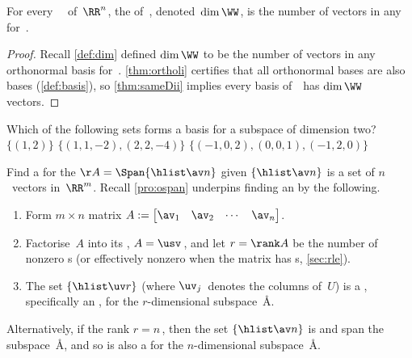 \begin{theorem} \label{thm:dimii} 
For every ~\WW\ of~\(\RR^n\),  
the  of~\WW, denoted~\(\dim\WW\), is the number of vectors in any  for~\WW. 
\end{theorem}

\begin{proof} 
Recall \autoref{def:dim} defined \(\dim\WW\) to be the number of vectors in any orthonormal basis for~\WW.
\autoref{thm:ortholi} certifies that all orthonormal bases are also bases (\autoref{def:basis}), so \autoref{thm:sameDii} implies every basis of~\WW\ has \(\dim\WW\) vectors.
\end{proof}




\begin{activity}
Which of the following sets forms a basis for a subspace of dimension two?
{\(\{(1,2)\}\)}
{\(\{(1,1,-2),(2,2,-4)\}\)}
{\(\{(-1,0,2),(0,0,1),(-1,2,0)\}\)}
\end{activity}





\begin{procedure} \label{pro:bfs}
Find a  for the  \(\AA=\Span\{\hlist\av n\}\) given $\{\hlist\av n\}$ is a set of $n$~vectors in~\(\RR^m\).
Recall \autoref{pro:ospan} underpins finding an  by the following.
\begin{enumerate}
\item Form \(m\times n\) matrix $A:= \begin{bmatrix} \av_1 & \av_2& \cdots&\av_n \end{bmatrix}$. 
\item Factorise~\(A\) into its \svd, $A=\usv$\,, and let \(r=\rank A\) be the number of nonzero s (or effectively nonzero when the matrix has s, \autoref{sec:rle}).
\item The set \(\{\hlist\uv r\}\)  (where \(\uv_j\)~denotes the columns of~$U$) is a , specifically an , for the \(r\)-dimensional subspace~\AA.
\end{enumerate}
Alternatively, if the rank \(r=n\)\,, then the set \(\{\hlist\av n\}\) is  and span the subspace~\AA, and so is also a  for the \(n\)-dimensional subspace~\AA.
\end{procedure}



